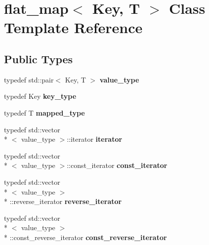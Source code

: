 \hypertarget{classflat__map}{\section{flat\+\_\+map$<$ Key, T $>$ Class Template Reference}
\label{classflat__map}
}
\subsection*{Public Types}
\begin{DoxyCompactItemize}
\item 
\hypertarget{classflat__map_a6581ef62bd21bb226dfe517c3ed43b5a}{typedef std\+::pair$<$ Key, T $>$ {\bfseries value\+\_\+type}}\label{classflat__map_a6581ef62bd21bb226dfe517c3ed43b5a}

\item 
\hypertarget{classflat__map_a7e95e5b3dda48e5c2474ca6b909d2677}{typedef Key {\bfseries key\+\_\+type}}\label{classflat__map_a7e95e5b3dda48e5c2474ca6b909d2677}

\item 
\hypertarget{classflat__map_a7613e7e076835aa5cf82b080f43bb0b5}{typedef T {\bfseries mapped\+\_\+type}}\label{classflat__map_a7613e7e076835aa5cf82b080f43bb0b5}

\item 
\hypertarget{classflat__map_ab4a6ac010ab97689b3a62818e2a6614a}{typedef std\+::vector\\*
$<$ value\+\_\+type $>$\+::iterator {\bfseries iterator}}\label{classflat__map_ab4a6ac010ab97689b3a62818e2a6614a}

\item 
\hypertarget{classflat__map_a933a888ad3685b983832290d386433bb}{typedef std\+::vector\\*
$<$ value\+\_\+type $>$\+::const\+\_\+iterator {\bfseries const\+\_\+iterator}}\label{classflat__map_a933a888ad3685b983832290d386433bb}

\item 
\hypertarget{classflat__map_aa5e77dd653cc21aa6c61d256cc028d27}{typedef std\+::vector\\*
$<$ value\+\_\+type $>$\\*
\+::reverse\+\_\+iterator {\bfseries reverse\+\_\+iterator}}\label{classflat__map_aa5e77dd653cc21aa6c61d256cc028d27}

\item 
\hypertarget{classflat__map_a59a3e7bca67921951ba0e4cc60ab911b}{typedef std\+::vector\\*
$<$ value\+\_\+type $>$\\*
\+::const\+\_\+reverse\+\_\+iterator {\bfseries const\+\_\+reverse\+\_\+iterator}}\label{classflat__map_a59a3e7bca67921951ba0e4cc60ab911b}

\end{DoxyCompactItemize}
